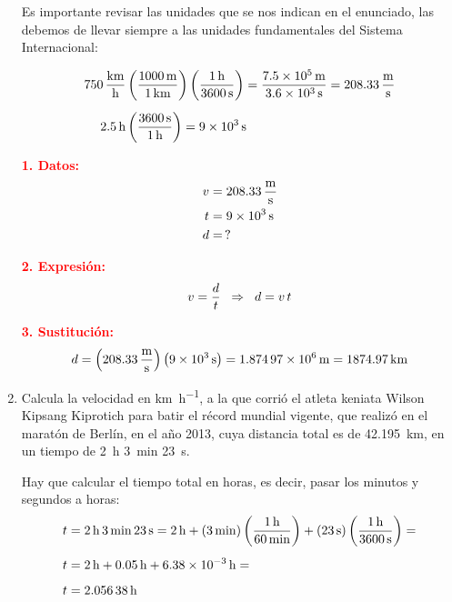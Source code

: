 \documentclass[14pt]{extarticle}
\newcommand{\textocolor}[2]{\textbf{\textcolor{#1}{#2}}}
\begin{document}
\begin{enumerate}
Es importante revisar las unidades que se nos indican en el enunciado, las debemos de llevar siempre a las unidades fundamentales del Sistema Internacional:

\begin{align*}
\SI[per-mode=fraction]{750}{\kilo\meter\per\hour} &\left( \dfrac{\SI{1000}{\meter}}{\SI{1}{\kilo\meter}} \right) \left( \dfrac{\SI{1}{\hour}}{\SI{3600}{\second}} \right) = \dfrac{\SI{7.5d5}{\meter}}{\SI{3.6d3}{\second}} = \SI[per-mode=fraction]{208.33}{\meter\per\second} \\[0.5em]
\SI{2.5}{\hour} &\left( \dfrac{\SI{3600}{\second}}{\SI{1}{\hour}} \right) = \SI{9d3}{\second}
\end{align*}

\begin{minipage}[t]{0.4\linewidth}
\textocolor{red}{1. Datos:}
\begin{align*}
v &= \SI[per-mode=fraction]{208.33}{\meter\per\second} \\
t &= \SI{9d3}{\second} \\
d &= \, ?
\end{align*}
\end{minipage}
\hspace{1cm}
\begin{minipage}[t]{0.4\linewidth}
\textocolor{red}{2. Expresión:}
\begin{align*}
v = \dfrac{d}{t} \hspace{0.2cm} \Rightarrow \hspace{0.2cm} d = v \, t
\end{align*}
\end{minipage}

\textocolor{red}{3. Sustitución:}
\begin{align*}
d = \left( \SI[per-mode=fraction]{208.33}{\meter\per\second} \right) \left( \SI{9d3}{\second} \right) = \SI{1.87497d6}{\meter} = \SI{1874.97}{\kilo\meter}
\end{align*}
\item Calcula la velocidad en \unit{\kilo\meter\per\hour}, a la que corrió el atleta keniata Wilson Kipsang Kiprotich para batir el récord mundial vigente, que realizó en el maratón de Berlín, en el año 2013, cuya distancia total es de \SI{42.195}{\kilo\meter}, en un tiempo de \SI{2}{\hour} \SI{3}{\minute} \SI{23}{\second}.

Hay que calcular el tiempo total en horas, es decir, pasar los minutos y segundos a horas:
\begin{align*}
t &= \SI{2}{\hour} \, \SI{3}{\minute} \, \SI{23}{\second} = \SI{2}{\hour} + (\SI{3}{\minute}) \left( \dfrac{\SI{1}{\hour}}{\SI{60}{\minute}} \right) + (\SI{23}{\second}) \left( \dfrac{\SI{1}{\hour}}{\SI{3600}{\second}} \right) = \\[0.5em]
t &= \SI{2}{\hour} + \SI{0.05}{\hour} + \SI{6.38d-3}{\hour} = \\[0.5em]
t &= \SI{2.05638}{\hour}
\end{align*}


\end{enumerate}
\end{document}
